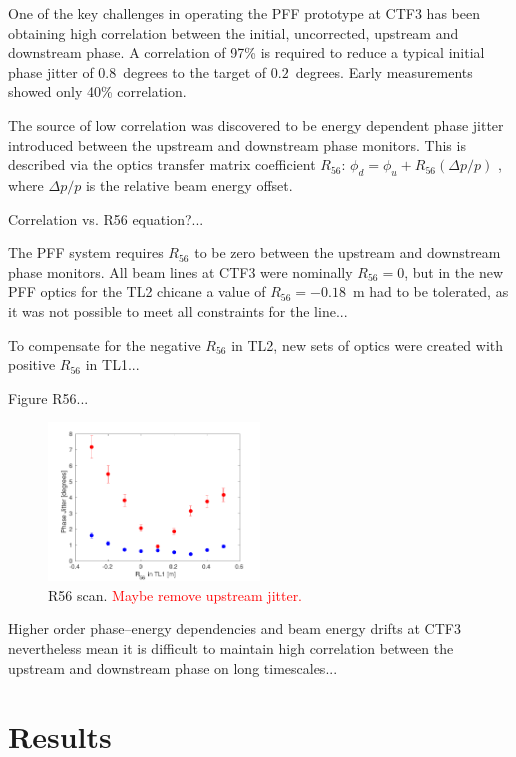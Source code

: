 \documentclass[%
 reprint,
 amsmath,amssymb,
 aps,
]{revtex4-1}
\begin{document}
One of the key challenges in operating the PFF prototype at CTF3 has been 
obtaining high correlation between the initial, uncorrected, upstream and 
downstream phase. A correlation of 97\% is required to reduce a typical initial 
phase jitter of \(0.8\)~degrees to the target of \(0.2\)~degrees. Early 
measurements showed only 40\% correlation.

The source of low correlation was discovered to be energy dependent phase 
jitter introduced between the upstream and downstream phase monitors. This is 
described via the optics transfer matrix coefficient \(R_{56}\):
\(\phi_d = \phi_u + R_{56}(\Delta p / p)\)
, where \(\Delta p / p\) is the relative beam energy offset.

Correlation vs. R56 equation?...

The PFF system requires \(R_{56}\) to be zero between the upstream and 
downstream phase monitors. All beam lines at CTF3 were nominally \(R_{56}=0\), 
but in the new PFF optics for the TL2 chicane a value of \(R_{56}=-0.18\)~m had 
to be tolerated, as it was not possible to meet all constraints for the line...

To compensate for the negative \(R_{56}\) in TL2, new sets of optics were 
created with positive \(R_{56}\) in TL1...

Figure R56...

\begin{figure}
	\includegraphics[width=0.5\textwidth]{figs/r56Scan}%
	\caption{\label{fig:r56Scan}R56 scan. \textcolor{red}{Maybe remove 
	upstream jitter.}}
\end{figure}


Higher order phase--energy dependencies and beam energy drifts at CTF3 
nevertheless mean it is difficult to maintain high correlation between the 
upstream and downstream phase on long timescales...

\section{\label{s:results}Results}
\end{document}
